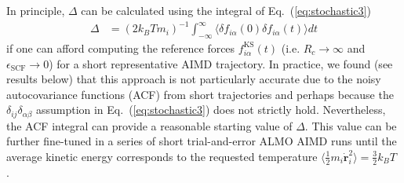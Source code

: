 \documentclass[aps,prl,reprint,amsmath,amssymb]{revtex4-1}
\begin{document}

In principle, $\Delta$ can be calculated using the integral of Eq.~(\ref{eq:stochastic3})
%
\begin{align}
\label{eq:delta}
\Delta &= (2 k_B T m_i )^{-1} \int_{-\infty}^{\infty}\langle \delta f_{i\alpha} (0)  \delta f_{i\alpha} (t) \rangle dt
\end{align}
%
if one can afford computing the reference forces $f^{\text{KS}}_{i\alpha}(t)$ (i.e. $R_c \rightarrow \infty$ and $\epsilon_{\text{SCF}} \rightarrow 0$) for a short representative AIMD trajectory. 
In practice, we found (see results below) that this approach is not particularly accurate due to the noisy autocovariance functions (ACF) from short trajectories and perhaps because the $\delta_{ij}\delta_{\alpha\beta}$ assumption in Eq.~(\ref{eq:stochastic3}) does not strictly hold. 
Nevertheless, the ACF integral can provide a reasonable starting value of $\Delta$. This value can be further fine-tuned in a series of short trial-and-error ALMO AIMD runs until the average kinetic energy corresponds to the requested temperature $\langle \frac{1}{2} m_i \dot{\bm{r}}^{2}_{i} \rangle = \frac{3}{2} k_{B} T$ .


\end{document}
